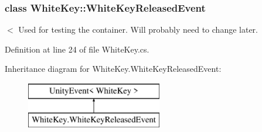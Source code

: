 \subsubsection{class White\+Key\+:\+:White\+Key\+Released\+Event}
$<$ Used for testing the container. Will probably need to change later. 

Definition at line 24 of file White\+Key.\+cs.

Inheritance diagram for White\+Key.\+White\+Key\+Released\+Event\+:\begin{figure}[H]
\begin{center}
\leavevmode
\includegraphics[height=2.000000cm]{group___white_key_event_types}
\end{center}
\end{figure}
